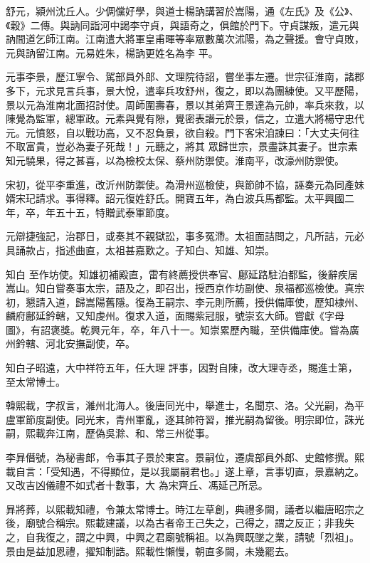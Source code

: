 \begin{pinyinscope}
 舒元，潁州沈丘人。少倜儻好學，與道士楊訥講習於嵩陽，通《左氏》及《公》、《穀》二傳。與訥同詣河中謁李守貞，與語奇之，俱館於門下。守貞謀叛，遣元與訥間道乞師江南。江南遣大將軍皇甫暉等率眾數萬次沭陽，為之聲援。會守貞敗，元與訥留江南。元易姓朱，楊訥更姓名為李
 平。



 元事李景，歷江寧令、駕部員外郎、文理院待詔，嘗坐事左遷。世宗征淮南，諸郡多下，元求見言兵事，景大悅，遣率兵攻舒州，復之，即以為團練使。又平歷陽，景以元為淮南北面招討使。周師圍壽春，景以其弟齊王景達為元帥，率兵來救，以陳覺為監軍，總軍政。元素與覺有隙，覺密表譖元於景，信之，立遣大將楊守忠代元。元憤怒，自以戰功高，又不忍負景，欲自殺。門下客宋洎諫曰：「大丈夫何往不取富貴，豈必為妻子死哉！」元聽之，將其
 眾歸世宗，景盡誅其妻子。世宗素知元驍果，得之甚喜，以為檢校太保、蔡州防禦使。淮南平，改濠州防禦使。



 宋初，從平李重進，改沂州防禦使。為滑州巡檢使，與節帥不協，誣奏元為同產妹婿宋玘請求。事得釋。詔元復姓舒氏。開寶五年，為白波兵馬都監。太平興國二年，卒，年五十五，特贈武泰軍節度。



 元辯捷強記，治郡日，或奏其不親獄訟，事多冤滯。太祖面詰問之，凡所詰，元必具誦款占，指述曲直，太祖甚嘉歎之。子知白、知雄、知崇。



 知白
 至作坊使。知雄初補殿直，雷有終薦授供奉官、鄜延路駐泊都監，後辭疾居嵩山。知白嘗奏事太宗，語及之，即召出，授西京作坊副使、泉福都巡檢使。真宗初，懇請入道，歸嵩陽舊隱。復為王嗣宗、李元則所薦，授供備庫使，歷知棣州、麟府鄜延鈐轄，又知虔州。復求入道，面賜紫冠服，號崇玄大師。嘗獻《字母圖》，有詔褒獎。乾興元年，卒，年八十一。知崇累歷內職，至供備庫使。嘗為廣州鈐轄、河北安撫副使，卒。



 知白子昭遠，大中祥符五年，任大理
 評事，因對自陳，改大理寺丞，賜進士第，至太常博士。



 韓熙載，字叔言，濰州北海人。後唐同光中，舉進士，名聞京、洛。父光嗣，為平盧軍節度副使。同光末，青州軍亂，逐其帥符習，推光嗣為留後。明宗即位，誅光嗣，熙載奔江南，歷偽吳滁、和、常三州從事。



 李昪僭號，為秘書郎，令事其子景於東宮。景嗣位，遷虞部員外郎、史館修撰。熙載自言：「受知遇，不得顯位，是以我屬嗣君也。」遂上章，言事切直，景嘉納之。又改吉凶儀禮不如式者十數事，大
 為宋齊丘、馮延己所忌。



 昪將葬，以熙載知禮，令兼太常博士。時江左草創，典禮多闕，議者以繼唐昭宗之後，廟號合稱宗。熙載建議，以為古者帝王己失之，己得之，謂之反正；非我失之，自我復之，謂之中興，中興之君廟號稱祖。以為興既墜之業，請號「烈祖」。景由是益加恩禮，擢知制誥。熙載性懶慢，朝直多闕，未幾罷去。




\end{pinyinscope}
